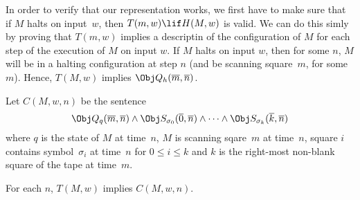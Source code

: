 \documentclass[../../include/open-logic-section]{subfiles}
\begin{document}

\begin{explain}
In order to verify that our representation works, we first have to
make sure that if $M$ halts on input~$w$, then $T(m, w) \lif H(M, w)$
is valid.  We can do this simly by proving that $T(m, w)$ implies a
descriptin of the configuration of $M$ for each step of the execution
of $M$ on input $w$.  If $M$ halts on input $w$, then for some $n$,
$M$ will be in a halting configuration at step $n$ (and be scanning
square~$m$, for some $m$).  Hence, $T(M, w)$ implies $\Obj
Q_h(\overline m, \overline n)$.
\end{explain}

\begin{defn}
Let $C(M, w, n)$ be the sentence
\[
\Obj Q_q(\overline m, \overline n) \land \Obj S_{\sigma_0}(\overline
0, \overline n) \land \dots \land \Obj S_{\sigma_k}(\overline k,
\overline n)
\]
where $q$ is the state of $M$ at time~$n$, $M$ is scanning sqare~$m$
at time~$n$, square $i$ contains symbol~$\sigma_i$ at time~$n$ for $0
\le i \le k$ and $k$ is the right-most non-blank square of the tape at
time~$m$.
\end{defn}

\begin{lem}
For each $n$, $T(M, w)$ implies $C(M, w, n)$.
\end{lem}
\end{document}
